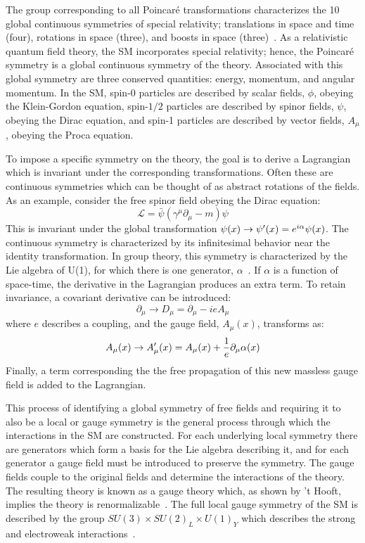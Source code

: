 The group corresponding to all Poincar\'e transformations characterizes the 10 global continuous symmetries of special relativity; translations in space and time (four), rotations in space (three), and boosts in space (three)~\cite{Srednicki}. As a relativistic quantum field theory, the SM incorporates special relativity; hence, the Poincar\'e symmetry is a global continuous symmetry of the theory. Associated with this global symmetry are three conserved quantities: energy, momentum, and angular momentum.  In the SM, spin-0 particles are described by scalar fields, $\phi$, obeying the Klein-Gordon equation, spin-$1/2$ particles are described by spinor fields, $\psi$, obeying the Dirac equation, and spin-1 particles are described by vector fields, $A_{\mu}$, obeying the Proca equation.

To impose a specific symmetry on the theory, the goal is to derive a Lagrangian which is invariant under the corresponding transformations. Often these are continuous symmetries which can be thought of as abstract rotations of the fields. As an example, consider the free spinor field obeying the Dirac equation:
$$\mathcal{L}=\bar{\psi}(\gamma^{\mu}\partial_{\mu}-m)\psi$$
This is invariant under the global transformation $\psi(x)\ra\psi'(x)=e^{i\alpha}\psi(x)$. The continuous symmetry is characterized by its infinitesimal behavior near the identity transformation. In group theory, this symmetry is characterized by the Lie algebra of U(1), for which there is one generator, $\alpha$~\cite{wukitung}. If $\alpha$ is a function of space-time, the derivative in the Lagrangian produces an extra term. To retain invariance, a covariant derivative can be introduced:
$$\partial_{\mu}\rightarrow D_{\mu} = \partial_{\mu} - ieA_{\mu}$$
where $e$ describes a coupling, and the gauge field, $A_{\mu}(x)$, transforms as:
$$A_{\mu}(x)\rightarrow A'_{\mu}(x)=A_{\mu}(x)+ \frac{1}{e}\partial_{\mu}\alpha(x)$$
Finally, a term corresponding the the free propagation of this new massless gauge field is added to the Lagrangian.

This process of identifying a global symmetry of free fields and requiring it to also be a local or gauge symmetry is the general process through which the interactions in the SM are constructed. For each underlying local symmetry there are generators which form a basis for the Lie algebra describing it, and for each generator a gauge field must be introduced to preserve the symmetry. The gauge fields couple to the original fields and determine the interactions of the theory. The resulting theory is known as a gauge theory which, as shown by 't Hooft, implies the theory is renormalizable~\cite{thooft}. The full local gauge symmetry of the SM is described by the group $SU(3)\times SU(2)_L\times U(1)_Y$ which describes the strong and electroweak interactions~\cite{Griffiths, Srednicki}.

